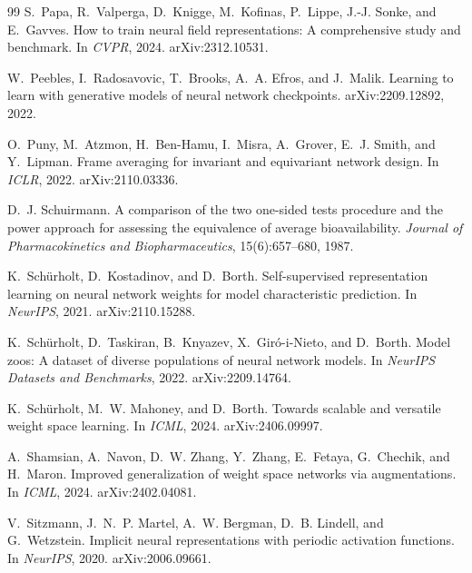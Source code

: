 \begin{thebibliography}{99}
S.~Papa, R.~Valperga, D.~Knigge, M.~Kofinas, P.~Lippe, J.-J. Sonke, and E.~Gavves.
\newblock How to train neural field representations: A comprehensive study and benchmark.
\newblock In \emph{CVPR}, 2024. arXiv:2312.10531.

W.~Peebles, I.~Radosavovic, T.~Brooks, A.~A. Efros, and J.~Malik.
\newblock Learning to learn with generative models of neural network checkpoints.
\newblock arXiv:2209.12892, 2022.

O.~Puny, M.~Atzmon, H.~Ben-Hamu, I.~Misra, A.~Grover, E.~J. Smith, and Y.~Lipman.
\newblock Frame averaging for invariant and equivariant network design.
\newblock In \emph{ICLR}, 2022. arXiv:2110.03336.

D.~J. Schuirmann.
\newblock A comparison of the two one-sided tests procedure and the power approach for assessing
the equivalence of average bioavailability.
\newblock \emph{Journal of Pharmacokinetics and Biopharmaceutics}, 15(6):657--680, 1987.

K.~Sch\"urholt, D.~Kostadinov, and D.~Borth.
\newblock Self-supervised representation learning on neural network weights for model
characteristic prediction.
\newblock In \emph{NeurIPS}, 2021. arXiv:2110.15288.

K.~Sch\"urholt, D.~Taskiran, B.~Knyazev, X.~Gir\'o-i-Nieto, and D.~Borth.
\newblock Model zoos: A dataset of diverse populations of neural network models.
\newblock In \emph{NeurIPS Datasets and Benchmarks}, 2022. arXiv:2209.14764.

K.~Sch\"urholt, M.~W. Mahoney, and D.~Borth.
\newblock Towards scalable and versatile weight space learning.
\newblock In \emph{ICML}, 2024. arXiv:2406.09997.

A.~Shamsian, A.~Navon, D.~W. Zhang, Y.~Zhang, E.~Fetaya, G.~Chechik, and H.~Maron.
\newblock Improved generalization of weight space networks via augmentations.
\newblock In \emph{ICML}, 2024. arXiv:2402.04081.

V.~Sitzmann, J.~N.~P. Martel, A.~W. Bergman, D.~B. Lindell, and G.~Wetzstein.
\newblock Implicit neural representations with periodic activation functions.
\newblock In \emph{NeurIPS}, 2020. arXiv:2006.09661.


\end{thebibliography}
